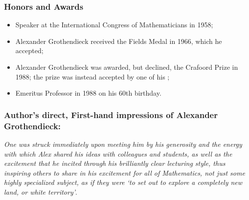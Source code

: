 \documentclass[12pt]{article}
\theoremstyle{plain}
\theoremstyle{definition}
\numberwithin{equation}{section}
\begin{document}
\subsubsection{Honors and Awards}

\begin{itemize}

\item Speaker at the International Congress of Mathematicians in 1958; 

\item Alexander Grothendieck received the Fields Medal in 1966, which he accepted; 

\item Alexander Grothendieck was awarded, but declined, the Crafoord Prize in 1988;
the prize was instead accepted by one of his 
;

\item Emeritus Professor in 1988 on his 60th birthday. 

\end{itemize}


\subsubsection{Author's direct, First-hand impressions of Alexander Grothendieck:}

 \emph{One was struck immediately upon meeting him by his generosity and the energy with which 
Alex shared his ideas with colleagues and students, as well as the excitement that 
he incited through his brilliantly clear lecturing style, thus inspiring others to share
in his excitement for all of Mathematics, not just some highly specialized subject,
as if they were `to set out to explore a completely new land, or white territory'}.
\end{document}

